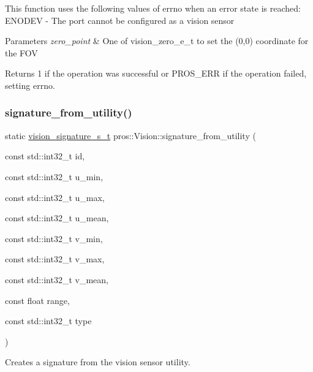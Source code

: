 This function uses the following values of errno when an error state is reached\+: E\+N\+O\+D\+EV -\/ The port cannot be configured as a vision sensor


\begin{DoxyParams}{Parameters}
{\em zero\+\_\+point} & One of vision\+\_\+zero\+\_\+e\+\_\+t to set the (0,0) coordinate for the F\+OV\\
\hline
\end{DoxyParams}
\begin{DoxyReturn}{Returns}
1 if the operation was successful or P\+R\+O\+S\+\_\+\+E\+RR if the operation failed, setting errno. 
\end{DoxyReturn}
\mbox{\label{classpros_1_1Vision_aa46f3bfb4956c7061b34764c92fc68fd}} 
\subsubsection{\texorpdfstring{signature\+\_\+from\+\_\+utility()}{signature\_from\_utility()}}
{\footnotesize\ttfamily static \hyperlink{vision_8h_a135c729c7277f6cc019c2924088a5fd5}{vision\+\_\+signature\+\_\+s\+\_\+t} pros\+::\+Vision\+::signature\+\_\+from\+\_\+utility (\begin{DoxyParamCaption}\item[{const std\+::int32\+\_\+t}]{id,  }\item[{const std\+::int32\+\_\+t}]{u\+\_\+min,  }\item[{const std\+::int32\+\_\+t}]{u\+\_\+max,  }\item[{const std\+::int32\+\_\+t}]{u\+\_\+mean,  }\item[{const std\+::int32\+\_\+t}]{v\+\_\+min,  }\item[{const std\+::int32\+\_\+t}]{v\+\_\+max,  }\item[{const std\+::int32\+\_\+t}]{v\+\_\+mean,  }\item[{const float}]{range,  }\item[{const std\+::int32\+\_\+t}]{type }\end{DoxyParamCaption})\hspace{0.3cm}{\ttfamily [static]}}



Creates a signature from the vision sensor utility. 


